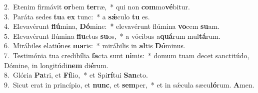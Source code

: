{2.~}Etenim firmávit \textbf{or}bem \textbf{ter}ræ,~* qui non \textbf{com}mo\textbf{vé}bitur.\\
{3.~}Paráta sedes \textbf{tu}a \textbf{ex} tunc:~* a \textbf{sǽ}culo \textbf{tu} es.\\
{4.~}Elevavérunt \textbf{flú}mina, \textbf{Dó}mine:~* elevavérunt flúmina \textbf{vo}cem \textbf{su}am.\\
{5.~}Elevavérunt flúmina \textbf{flu}ctus \textbf{su}os,~* a vócibus a\textbf{quá}rum mul\textbf{tá}rum.\\
{6.~}Mirábiles elati\textbf{ó}nes \textbf{ma}ris:~* mirábilis in \textbf{al}tis \textbf{Dó}minus.\\
{7.~}Testimónia tua credibília \textbf{fa}cta sunt \textbf{ni}mis:~* domum tuam decet sanctitúdo, Dómine, in longitúdi\textbf{nem} di\textbf{é}rum.\\
{8.~}Glória \textbf{Pa}tri, et \textbf{Fí}lio,~* et Spi\textbf{rí}tui \textbf{San}cto.\\
{9.~}Sicut erat in princípio, et \textbf{nunc}, et \textbf{sem}per,~* et in sǽcula sæcu\textbf{ló}rum. \textbf{A}men.\\
